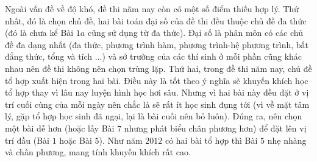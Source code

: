 \begin{multicols}{2}
	\vskip 0.1cm
	Ngoài vấn đề về độ khó, đề thi năm nay còn có một số điểm thiếu hợp lý. Thứ nhất, đó là chọn chủ đề, hai bài toán đại số của đề thi đều thuộc chủ đề đa thức (đó là chưa kể Bài $1a$ cũng sử dụng từ đa thức). Đại số là phân môn có các chủ đề đa dạng nhất (đa thức, phương trình hàm, phương trình-hệ phương trình, bất đẳng thức, tổng và tích ...) và sở trường của các thí sinh ở mỗi phần cũng khác nhau nên đề thi không nên chọn trùng lặp. Thứ hai, trong đề thi năm nay, chủ đề tổ hợp xuất hiện trong hai bài. Điều này là tốt theo ý nghĩa sẽ khuyến khích học tổ hợp thay vì lâu nay luyện hình học hơi sâu. Nhưng vì hai bài này đều đặt ở vị trí cuối cùng của mỗi ngày nên chắc là sẽ rất ít học sinh đụng tới (vì về mặt tâm lý, gặp tổ hợp học sinh đã ngại, lại là bài cuối nên bỏ luôn). Đúng ra, nên chọn một bài dễ hơn (hoặc lấy Bài $7$ nhưng phát biểu chân phương hơn) để đặt lên vị trí đầu (Bài $1$ hoặc Bài $5$). Như năm $2012$ có hai bài tổ hợp thì Bài $5$ nhẹ nhàng và chân phương, mang tính khuyến khích rất cao.
\end{multicols}